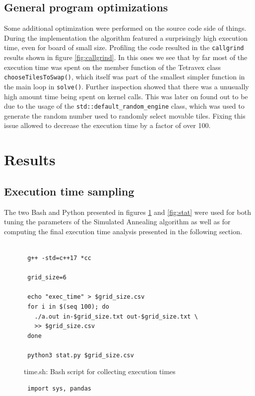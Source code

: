 \documentclass[11pt]{article}
\begin{document}
\begin{multicols*}{2}
\subsection{General program optimizations}
Some additional optimization were performed on the source code side of things.
During the implementation the algorithm featured a surprisingly high execution
time, even for board of small size. Profiling the code resulted in the
\texttt{callgrind} results shown in figure \ref{fig:callgrind}. In this ones we
see that by far most of the execution time was spent on the member function of
the Tetravex class \texttt{chooseTilesToSwap()}, which itself was part of the
smallest simpler function in the main loop in \texttt{solve()}. Further
inspection showed that there was a unusually high amount time being spent on
kernel calls. This was later on found out to be due to the usage of the
\texttt{std::default\_random\_engine} class, which was used to generate the
random number used to randomly select movable tiles. Fixing this issue allowed
to decrease the execution time by a factor of over 100.
\section{Results}
\subsection{Execution time sampling}
The two Bash and Python presented in figures \ref{fig:time} and \ref{fig:stat}
were used for both tuning the parameters of the Simulated Annealing algorithm
as well as for computing the final execution time analysis presented in the
following section.\\\\
\begin{figure}[H]
  \centering
  \begin{minipage}{0.5\textwidth}
  \begin{verbatim}
 g++ -std=c++17 *cc
  
 grid_size=6

 echo "exec_time" > $grid_size.csv
 for i in $(seq 100); do
   ./a.out in-$grid_size.txt out-$grid_size.txt \
   >> $grid_size.csv
 done
  
 python3 stat.py $grid_size.csv
  \end{verbatim}
  \end{minipage}
  \caption{time.sh: Bash script for collecting execution times}
  \label{fig:time}
\end{figure}
\begin{figure}[H]
  \centering
  \begin{minipage}{0.5\textwidth}
    \begin{verbatim}
 import sys, pandas


\end{verbatim}
\end{minipage}
\end{figure}
\end{multicols*}
\end{document}
